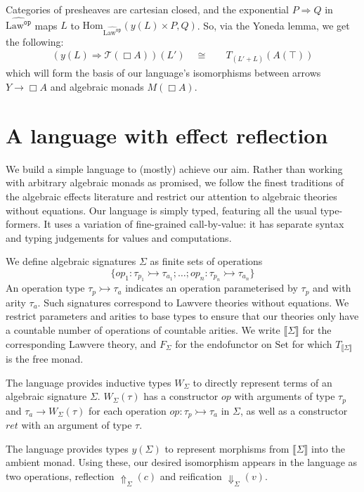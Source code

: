 \documentclass[acmsmall, screen, nonacm]{acmart}
\newcommand{\glob}{\mathop{\Box}}
\newcommand{\setc}{\mathrm{Set}}
\newcommand{\terminal}{\top}
\newcommand{\lawc}{\mathrm{Law}}
\newcommand{\lawcop}{\lawc^{\mathtt{op}}}
\newcommand{\pshlawcop}{\widehat{\lawcop}}
\newcommand{\yoneda}[1]{y(#1)}
\newcommand{\homset}[3]{\mathrm{Hom}_{#1}(#2, #3)}
\newcommand{\arrow}[2]{#1 \Rightarrow #2}
\newcommand{\sem}[1]{\llbracket #1 \rrbracket}
\newcommand{\reflectname}{\Uparrow}
\newcommand{\reflect}[2]{\reflectname_{#1}(#2)}
\newcommand{\reifyname}{\Downarrow}
\newcommand{\reify}[2]{\reifyname_{#1}(#2)}
\newcommand{\mon}{\mathcal{T}}
\newcommand{\ind}[1]{W_{#1}}
\begin{document}
Categories of presheaves are cartesian closed, and the exponential
$\arrow{P}{Q}$ in $\pshlawcop$ maps $L$ to
$\homset{\pshlawcop}{\yoneda{L} \times P}{Q}$. So, via the Yoneda lemma,
we get the following:
\begin{align*}
(\arrow{\yoneda{L}}{\mon(\glob A)})(L') \quad \cong \quad &T_{(L' + L)}(A(\terminal))
\end{align*}
which will form the basis of our language's isomorphisms between arrows
$Y \rightarrow \glob A$ and algebraic monads $M(\glob A)$.

\section{A language with effect reflection}
\label{sec:language}

We build a simple language to (mostly) achieve our aim. Rather than
working with arbitrary algebraic monads as promised, we follow the
finest traditions of the algebraic effects literature and restrict our
attention to algebraic theories without equations. Our language is
simply typed, featuring all the usual type-formers. It uses a variation
of fine-grained call-by-value: it has separate syntax and typing
judgements for values and computations.

We define algebraic signatures $\Sigma$ as finite sets of operations
\[
\{ op_1 \mathop{:} \tau_{p_1} \rightarrowtail \tau_{a_1}; \ldots; op_n
\mathop{:} \tau_{p_n} \rightarrowtail \tau_{a_n} \}
\]
An operation type
$\tau_p \rightarrowtail \tau_a$ indicates an operation parameterised by
$\tau_p$ and with arity $\tau_a$. Such signatures correspond to Lawvere
theories without equations. We restrict parameters and arities to base
types to ensure that our theories only have a countable number of
operations of countable arities. We write $\sem{\Sigma}$ for the
corresponding Lawvere theory, and $F_\Sigma$ for the endofunctor on
$\setc$ for which $T_{\sem{\Sigma}}$ is the free monad.

The language provides inductive types $\ind{\Sigma}$ to directly
represent terms of an algebraic signature $\Sigma$. $\ind{\Sigma}(\tau)$
has a constructor $op$ with arguments of type $\tau_p$ and
$\tau_a \rightarrow \ind{\Sigma}(\tau)$ for each operation
$op \mathop{:} \tau_p \rightarrowtail \tau_a$ in $\Sigma$, as well as a
constructor $ret$ with an argument of type $\tau$.

The language provides types $\yoneda{\Sigma}$ to represent morphisms
from $\sem{\Sigma}$ into the ambient monad. Using these, our desired
isomorphism appears in the language as two operations, reflection
$\reflect{\Sigma}{c}$ and reification $\reify{\Sigma}{v}$.
\end{document}
